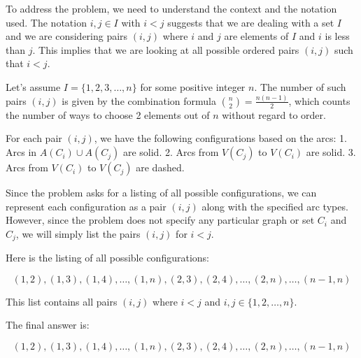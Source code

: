 To address the problem, we need to understand the context and the notation used. The notation \( i, j \in I \) with \( i < j \) suggests that we are dealing with a set \( I \) and we are considering pairs \((i, j)\) where \( i \) and \( j \) are elements of \( I \) and \( i \) is less than \( j \). This implies that we are looking at all possible ordered pairs \((i, j)\) such that \( i < j \).

Let's assume \( I = \{1, 2, 3, \ldots, n\} \) for some positive integer \( n \). The number of such pairs \((i, j)\) is given by the combination formula \( \binom{n}{2} = \frac{n(n-1)}{2} \), which counts the number of ways to choose 2 elements out of \( n \) without regard to order.

For each pair \((i, j)\), we have the following configurations based on the arcs:
1. Arcs in \( A(C_i) \cup A(C_j) \) are solid.
2. Arcs from \( V(C_j) \) to \( V(C_i) \) are solid.
3. Arcs from \( V(C_i) \) to \( V(C_j) \) are dashed.

Since the problem asks for a listing of all possible configurations, we can represent each configuration as a pair \((i, j)\) along with the specified arc types. However, since the problem does not specify any particular graph or set \( C_i \) and \( C_j \), we will simply list the pairs \((i, j)\) for \( i < j \).

Here is the listing of all possible configurations:

\[
(1, 2), (1, 3), (1, 4), \ldots, (1, n), (2, 3), (2, 4), \ldots, (2, n), \ldots, (n-1, n)
\]

This list contains all pairs \((i, j)\) where \( i < j \) and \( i, j \in \{1, 2, \ldots, n\} \).

The final answer is:

\[
\boxed{(1, 2), (1, 3), (1, 4), \ldots, (1, n), (2, 3), (2, 4), \ldots, (2, n), \ldots, (n-1, n)}
\]